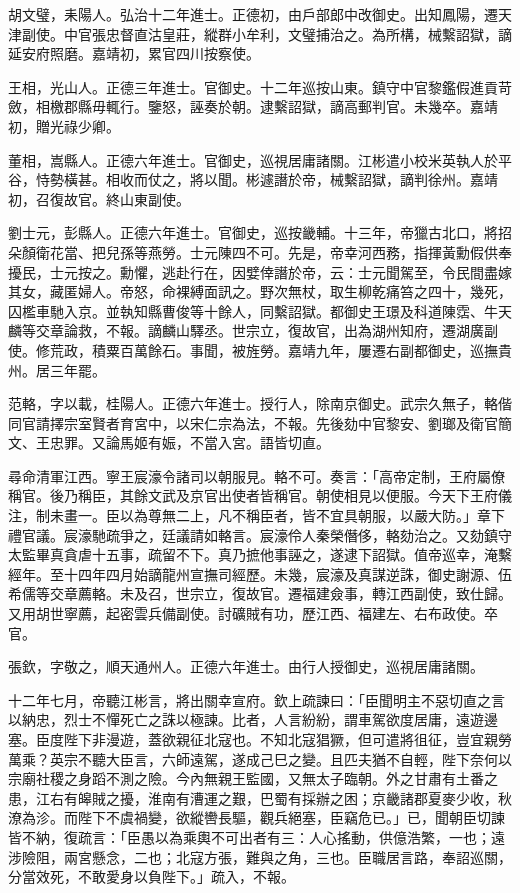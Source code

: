 \begin{pinyinscope}
胡文璧，耒陽人。弘治十二年進士。正德初，由戶部郎中改御史。出知鳳陽，遷天津副使。中官張忠督直沽皇莊，縱群小牟利，文璧捕治之。為所構，械繫詔獄，謫延安府照磨。嘉靖初，累官四川按察使。

王相，光山人。正德三年進士。官御史。十二年巡按山東。鎮守中官黎鑑假進貢苛斂，相檄郡縣毋輒行。鑒怒，誣奏於朝。逮繫詔獄，謫高郵判官。未幾卒。嘉靖初，贈光祿少卿。

董相，嵩縣人。正德六年進士。官御史，巡視居庸諸關。江彬遣小校米英執人於平谷，恃勢橫甚。相收而仗之，將以聞。彬遽譖於帝，械繫詔獄，謫判徐州。嘉靖初，召復故官。終山東副使。

劉士元，彭縣人。正德六年進士。官御史，巡按畿輔。十三年，帝獵古北口，將招朵顏衛花當、把兒孫等燕勞。士元陳四不可。先是，帝幸河西務，指揮黃勳假供奉擾民，士元按之。勳懼，逃赴行在，因嬖倖譖於帝，云：士元聞駕至，令民間盡嫁其女，藏匿婦人。帝怒，命裸縛面訊之。野次無杖，取生柳乾痛笞之四十，幾死，囚檻車馳入京。並執知縣曹俊等十餘人，同繫詔獄。都御史王璟及科道陳霑、牛天麟等交章論救，不報。謫麟山驛丞。世宗立，復故官，出為湖州知府，遷湖廣副使。修荒政，積粟百萬餘石。事聞，被旌勞。嘉靖九年，屢遷右副都御史，巡撫貴州。居三年罷。

范輅，字以載，桂陽人。正德六年進士。授行人，除南京御史。武宗久無子，輅偕同官請擇宗室賢者育宮中，以宋仁宗為法，不報。先後劾中官黎安、劉瑯及衛官簡文、王忠罪。又論馬姬有娠，不當入宮。語皆切直。

尋命清軍江西。寧王宸濠令諸司以朝服見。輅不可。奏言：「高帝定制，王府屬僚稱官。後乃稱臣，其餘文武及京官出使者皆稱官。朝使相見以便服。今天下王府儀注，制未畫一。臣以為尊無二上，凡不稱臣者，皆不宜具朝服，以嚴大防。」章下禮官議。宸濠馳疏爭之，廷議請如輅言。宸濠伶人秦榮僭侈，輅劾治之。又劾鎮守太監畢真貪虐十五事，疏留不下。真乃摭他事誣之，遂逮下詔獄。值帝巡幸，淹繫經年。至十四年四月始謫龍州宣撫司經歷。未幾，宸濠及真謀逆誅，御史謝源、伍希儒等交章薦輅。未及召，世宗立，復故官。遷福建僉事，轉江西副使，致仕歸。又用胡世寧薦，起密雲兵備副使。討礦賊有功，歷江西、福建左、右布政使。卒官。

張欽，字敬之，順天通州人。正德六年進士。由行人授御史，巡視居庸諸關。

十二年七月，帝聽江彬言，將出關幸宣府。欽上疏諫曰：「臣聞明主不惡切直之言以納忠，烈士不憚死亡之誅以極諫。比者，人言紛紛，謂車駕欲度居庸，遠遊邊塞。臣度陛下非漫遊，蓋欲親征北寇也。不知北寇猖獗，但可遣將徂征，豈宜親勞萬乘？英宗不聽大臣言，六師遠駕，遂成己巳之變。且匹夫猶不自輕，陛下奈何以宗廟社稷之身蹈不測之險。今內無親王監國，又無太子臨朝。外之甘肅有土番之患，江右有皞賊之擾，淮南有漕運之艱，巴蜀有採辦之困；京畿諸郡夏麥少收，秋潦為沴。而陛下不虞禍變，欲縱轡長驅，觀兵絕塞，臣竊危已。」已，聞朝臣切諫皆不納，復疏言：「臣愚以為乘輿不可出者有三：人心搖動，供億浩繁，一也；遠涉險阻，兩宮懸念，二也；北寇方張，難與之角，三也。臣職居言路，奉詔巡關，分當效死，不敢愛身以負陛下。」疏入，不報。


\end{pinyinscope}
